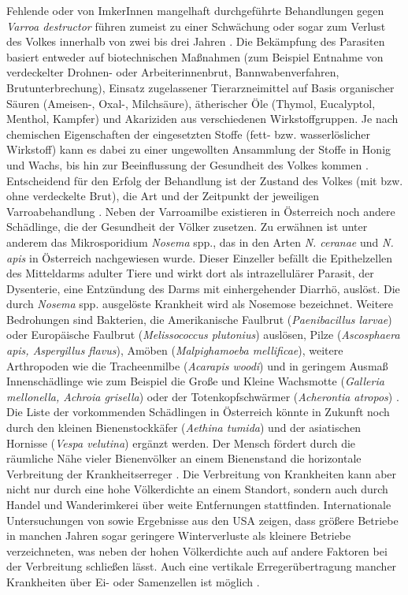 Fehlende oder von ImkerInnen mangelhaft durchgeführte Behandlungen gegen \textit{Varroa destructor} führen zumeist zu einer Schwächung oder sogar zum Verlust des Volkes innerhalb von zwei bis drei Jahren \citep{rosenkranz2010}. Die Bekämpfung des Parasiten basiert entweder auf biotechnischen Maßnahmen (zum Beispiel Entnahme von verdeckelter Drohnen- oder Arbeiterinnenbrut, Bannwabenverfahren, Brutunterbrechung), Einsatz zugelassener Tierarzneimittel auf Basis organischer Säuren (Ameisen-, Oxal-, Milchsäure), ätherischer Öle (Thymol, Eucalyptol, Menthol, Kampfer) und Akariziden aus verschiedenen Wirkstoffgruppen. Je nach chemischen Eigenschaften der eingesetzten Stoffe (fett- bzw. wasserlöslicher Wirkstoff) kann es dabei zu einer ungewollten Ansammlung der Stoffe in Honig und Wachs, bis hin zur Beeinflussung der Gesundheit des Volkes kommen \citep{rosenkranz2010, noel2020}. Entscheidend für den Erfolg der Behandlung ist der Zustand des Volkes (mit bzw. ohne verdeckelte Brut), die Art und der Zeitpunkt der jeweiligen Varroabehandlung \citep{brodschneider2013, vanderzee2014}.
\newline
Neben der Varroamilbe existieren in Österreich noch andere Schädlinge, die der Gesundheit der Völker zusetzen. Zu erwähnen ist unter anderem das Mikrosporidium \textit{Nosema} spp., das in den Arten \textit{N. ceranae} und \textit{N. apis} in Österreich nachgewiesen wurde. Dieser Einzeller befällt die Epithelzellen des Mitteldarms adulter Tiere und wirkt dort als intrazellulärer Parasit, der Dysenterie, eine Entzündung des Darms mit einhergehender Diarrhö, auslöst. Die durch \textit{Nosema} spp. ausgelöste Krankheit wird als Nosemose bezeichnet. Weitere Bedrohungen sind Bakterien, die Amerikanische Faulbrut (\textit{Paenibacillus larvae}) oder Europäische Faulbrut (\textit{Melissococcus plutonius}) auslösen, Pilze (\textit{Ascosphaera apis, Aspergillus flavus}), Amöben (\textit{Malpighamoeba mellificae}), weitere Arthropoden wie die Tracheenmilbe (\textit{Acarapis woodi}) und in geringem Ausmaß Innenschädlinge wie zum Beispiel die Große und Kleine Wachsmotte (\textit{Galleria mellonella, Achroia grisella}) oder der Totenkopfschwärmer (\textit{Acherontia atropos}) \citep{brodschneider2011}. Die Liste der vorkommenden Schädlingen in Österreich könnte in Zukunft noch durch den kleinen Bienenstockkäfer (\textit{Aethina tumida}) \citep{neumann2016} und der asiatischen Hornisse (\textit{Vespa velutina}) \citep{monceau2014} ergänzt werden.
\newline
Der Mensch fördert durch die räumliche Nähe vieler Bienenvölker an einem Bienenstand die horizontale Verbreitung der Krankheitserreger \citep{seeley2015, degrandi-hoffman2015, forfert2016}. Die Verbreitung von Krankheiten kann aber nicht nur durch eine hohe Völkerdichte an einem Standort, sondern auch durch Handel und Wanderimkerei über weite Entfernungen stattfinden. Internationale Untersuchungen von \cite{vanderzee2012, vanderzee2014} sowie Ergebnisse aus den USA \citep{steinhauer2014,lee2015} zeigen, dass größere Betriebe in manchen Jahren sogar geringere Winterverluste als kleinere Betriebe verzeichneten, was neben der hohen Völkerdichte auch auf andere Faktoren bei der Verbreitung schließen lässt. Auch eine vertikale Erregerübertragung mancher Krankheiten über Ei- oder Samenzellen ist möglich \citep{peng2015, yue2007}.

